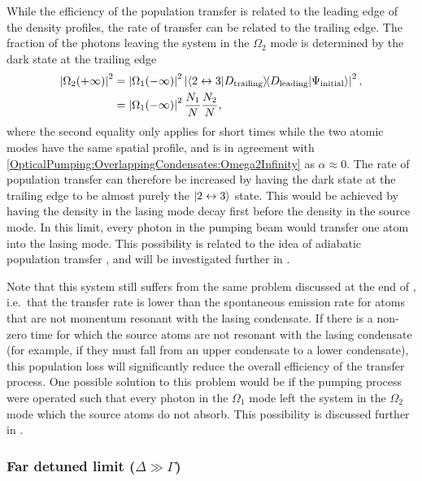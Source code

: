 While the efficiency of the population transfer is related to the leading edge of the density profiles, the rate of transfer can be related to the trailing edge.  The fraction of the photons leaving the system in the $\Omega_2$ mode is determined by the dark state at the trailing edge
\begin{align}
    \left|\Omega_2(+\infty)\right|^2 &= \left|\Omega_1(-\infty)\right|^2 \left|\left<2 \leftrightarrow 3\middle|D_\text{trailing}\right>\!\! \left<D_\text{leading}\middle|\Psi_\text{initial}\right>\right|^2, \\
    &= \left|\Omega_1(-\infty)\right|^2 \frac{N_1}{N} \frac{N_2}{N},
\end{align}
where the second equality only applies for short times while the two atomic modes have the same spatial profile, and is in agreement with \eqref{OpticalPumping:OverlappingCondensates:Omega2Infinity} as $\alpha \approx 0$.  The rate of population transfer can therefore be increased by having the dark state at the trailing edge to be almost purely the ${\left|2 \leftrightarrow 3\right>}$ state.  This would be achieved by having the density in the lasing mode decay first before the density in the source mode.  In this limit, every photon in the pumping beam would transfer one atom into the lasing mode.  This possibility is related to the idea of adiabatic population transfer \citep{Kuklinski:1989}, and will be investigated further in .


Note that this system still suffers from the same problem discussed at the end of , i.e.\ that the transfer rate is lower than the spontaneous emission rate for atoms that are not momentum resonant with the lasing condensate.  If there is a non-zero time for which the source atoms are not resonant with the lasing condensate (for example, if they must fall from an upper condensate to a lower condensate), this population loss will significantly reduce the overall efficiency of the transfer process.  One possible solution to this problem would be if the pumping process were operated such that every photon in the $\Omega_1$ mode left the system in the $\Omega_2$ mode which the source atoms do not absorb.  This possibility is discussed further in .

\subsubsection{Far detuned limit ($\Delta \gg \Gamma$)}

